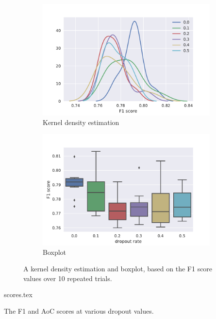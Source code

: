 \begin{figure}[htbp]
  \centering
  \begin{subfigure}[t]{0.49\textwidth}
    \centering
    \includegraphics[width=\textwidth]{./figures/results/dropout/kde_f1.pdf}
    \caption{Kernel density estimation}%
    \label{fig:dropout_kde}
  \end{subfigure}
  \begin{subfigure}[t]{0.49\textwidth}
    \centering
    \includegraphics[width=\textwidth]{./figures/results/dropout/boxplot_f1.pdf}
    \caption{Boxplot}%
    \label{fig:dropout_box}
  \end{subfigure}
  \caption{A kernel density estimation and boxplot, based on the F1 score values
  over 10 repeated trials.}%
  \label{fig:dropout_dists}
\end{figure}

\begin{table}[htb]
  \centering
  {scores.tex}
  \caption{The F1 and AoC scores at various dropout values.}%
  \label{tbl:dropout}
\end{table}

